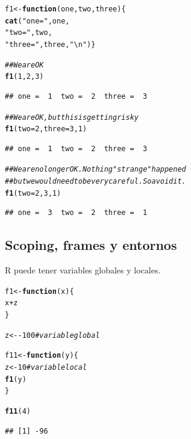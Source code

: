 \documentclass{config/apuntes}\usepackage[]{graphicx}\usepackage[]{xcolor}
\makeatletter
\newcommand{\hlnum}[1]{\textcolor[rgb]{0.686,0.059,0.569}{#1}}%
\newcommand{\hlsng}[1]{\textcolor[rgb]{0.192,0.494,0.8}{#1}}%
\newcommand{\hlcom}[1]{\textcolor[rgb]{0.678,0.584,0.686}{\textit{#1}}}%
\newcommand{\hlopt}[1]{\textcolor[rgb]{0,0,0}{#1}}%
\newcommand{\hldef}[1]{\textcolor[rgb]{0.345,0.345,0.345}{#1}}%
\newcommand{\hlkwa}[1]{\textcolor[rgb]{0.161,0.373,0.58}{\textbf{#1}}}%
\newcommand{\hlkwb}[1]{\textcolor[rgb]{0.69,0.353,0.396}{#1}}%
\newcommand{\hlkwc}[1]{\textcolor[rgb]{0.333,0.667,0.333}{#1}}%
\newcommand{\hlkwd}[1]{\textcolor[rgb]{0.737,0.353,0.396}{\textbf{#1}}}%
\newenvironment{kframe}{%
 \def\at@end@of@kframe{}%
 \ifinner\ifhmode%
  \def\at@end@of@kframe{\end{minipage}}%
  \begin{minipage}{\columnwidth}%
 \fi\fi%
 \def\FrameCommand##1{\hskip\@totalleftmargin \hskip-\fboxsep
 \colorbox{shadecolor}{##1}\hskip-\fboxsep
     \hskip-\linewidth \hskip-\@totalleftmargin \hskip\columnwidth}%
 \MakeFramed {\advance\hsize-\width
   \@totalleftmargin\z@ \linewidth\hsize
   \@setminipage}}%
 {\par\unskip\endMakeFramed%
 \at@end@of@kframe}
\newenvironment{knitrout}{}{} %
\makeatother
\begin{document}
\begin{knitrout}
\color{fgcolor}\begin{kframe}
\begin{alltt}
\hldef{f1} \hlkwb{<-} \hlkwa{function}\hldef{(}\hlkwc{one}\hldef{,} \hlkwc{two}\hldef{,} \hlkwc{three}\hldef{) \{}
    \hlkwd{cat}\hldef{(}\hlsng{"one = "}\hldef{, one,}
        \hlsng{" two = "}\hldef{, two,}
        \hlsng{" three = "}\hldef{, three,} \hlsng{"\textbackslash{}n"}\hldef{)\}}

\hlcom{## We are OK}
\hlkwd{f1}\hldef{(}\hlnum{1}\hldef{,} \hlnum{2}\hldef{,} \hlnum{3}\hldef{)}
\end{alltt}
\begin{verbatim}
## one =  1  two =  2  three =  3
\end{verbatim}
\begin{alltt}
\hlcom{## We are OK, but this is getting risky}
\hlkwd{f1}\hldef{(}\hlkwc{two} \hldef{=} \hlnum{2}\hldef{,} \hlkwc{three} \hldef{=} \hlnum{3}\hldef{,} \hlnum{1}\hldef{)}
\end{alltt}
\begin{verbatim}
## one =  1  two =  2  three =  3
\end{verbatim}
\begin{alltt}
\hlcom{## We are no longer OK. Nothing "strange" happened}
\hlcom{## but we would need to be very careful. So avoid it.}
\hlkwd{f1}\hldef{(}\hlkwc{two} \hldef{=} \hlnum{2}\hldef{,} \hlnum{3}\hldef{,} \hlnum{1}\hldef{)}
\end{alltt}
\begin{verbatim}
## one =  3  two =  2  three =  1
\end{verbatim}
\end{kframe}
\end{knitrout}

\subsection{Scoping, frames y entornos}
R puede tener variables globales y locales. 

\begin{knitrout}
\color{fgcolor}\begin{kframe}
\begin{alltt}
\hldef{f1} \hlkwb{<-} \hlkwa{function}\hldef{(}\hlkwc{x}\hldef{) \{}
    \hldef{x} \hlopt{+} \hldef{z}
\hldef{\}}

\hldef{z} \hlkwb{<-} \hlopt{-}\hlnum{100} \hlcom{#variable global}

\hldef{f11} \hlkwb{<-} \hlkwa{function}\hldef{(}\hlkwc{y}\hldef{) \{}
    \hldef{z} \hlkwb{<-} \hlnum{10} \hlcom{#variable local}
    \hlkwd{f1}\hldef{(y)}
\hldef{\}}

\hlkwd{f11}\hldef{(}\hlnum{4}\hldef{)}
\end{alltt}
\begin{verbatim}
## [1] -96
\end{verbatim}
\end{kframe}
\end{knitrout}
\end{document}
